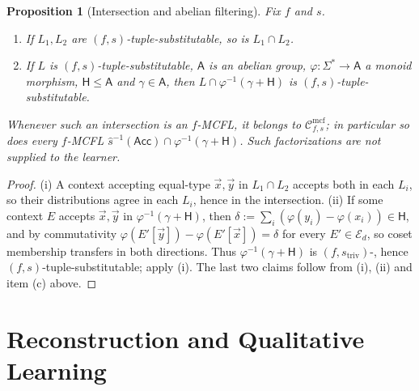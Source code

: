 \documentclass[11pt]{article}
\numberwithin{equation}{section}
\theoremstyle{plain}
\newtheorem{proposition}[theorem]{Proposition}
\theoremstyle{definition}
\theoremstyle{remark}
\newcommand{\Cmcf}[2]{\mathcal{C}^{\mathrm{mcf}}_{#1,#2}}
\newcommand{\tuple}[1]{\vec{#1}}
\begin{document}
\begin{proposition}[Intersection and abelian filtering]
\label{prop:abelian-coset-filter}
Fix $f$ and $s$.
\begin{enumerate}[label=(\roman*),leftmargin=*]
\item If $L_1,L_2$ are $(f,s)$-tuple-substitutable, so is $L_1\cap L_2$.
\item If $L$ is $(f,s)$-tuple-substitutable, $\mathsf A$ is an abelian group,
$\varphi:\Sigma^*\to\mathsf A$ a monoid morphism, $\mathsf H\le\mathsf A$ and
$\gamma\in\mathsf A$, then $L\cap\varphi^{-1}(\gamma+\mathsf H)$ is
$(f,s)$-tuple-substitutable.
\end{enumerate}
Whenever such an intersection is an $f$-MCFL, it belongs to $\Cmcf{f}{s}$;
in particular so does every $f$-MCFL
$\widehat{s}^{-1}(\mathsf{Acc})\cap\varphi^{-1}(\gamma+\mathsf H)$.  Such
factorizations are not supplied to the learner.
\end{proposition}

\begin{proof}
(i) A context accepting equal-type $\tuple x,\tuple y$ in $L_1\cap L_2$ accepts
both in each $L_i$, so their distributions agree in each $L_i$, hence in the
intersection.  (ii) If some context $E$ accepts $\tuple x,\tuple y$ in
$\varphi^{-1}(\gamma+\mathsf H)$, then
$\delta:=\sum_i(\varphi(y_i)-\varphi(x_i))\in\mathsf H$, and by commutativity
$\varphi(E'[\tuple y])-\varphi(E'[\tuple x])=\delta$ for every
$E'\in\mathcal E_d$, so coset membership transfers in both directions.  Thus
$\varphi^{-1}(\gamma+\mathsf H)$ is $(f,s_{\mathrm{triv}})$-, hence
$(f,s)$-tuple-substitutable; apply (i).  The last two claims follow from
(i), (ii) and item (c) above.
\end{proof}

\section{Reconstruction and Qualitative Learning}
\label{sec:learner}
\end{document}
